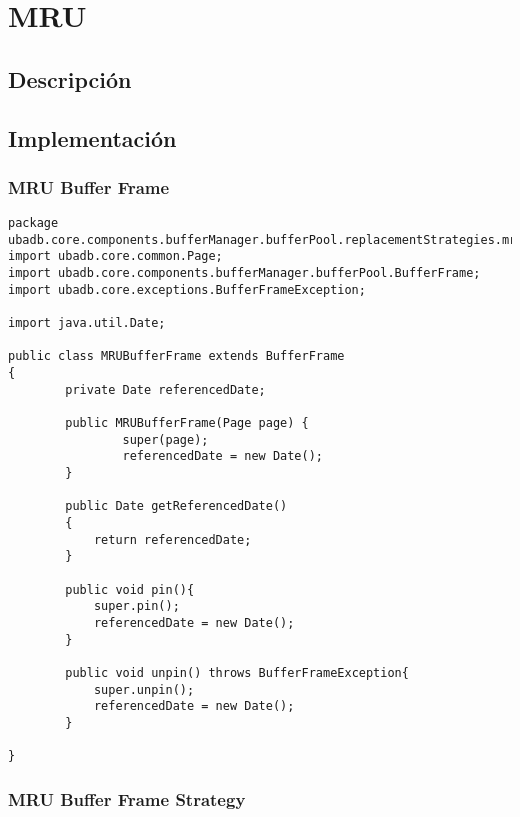 \section{MRU}

\subsection{Descripción}

\subsection{Implementación}
\subsubsection{MRU Buffer Frame}

\begin{lstlisting}
package ubadb.core.components.bufferManager.bufferPool.replacementStrategies.mru;
import ubadb.core.common.Page;
import ubadb.core.components.bufferManager.bufferPool.BufferFrame;
import ubadb.core.exceptions.BufferFrameException;

import java.util.Date;

public class MRUBufferFrame extends BufferFrame 
{
		private Date referencedDate;
	
        public MRUBufferFrame(Page page) {
                super(page); 
                referencedDate = new Date();
        }
        
        public Date getReferencedDate()
    	{
    		return referencedDate;
    	}
        
        public void pin(){
        	super.pin();
        	referencedDate = new Date();
        }
        
        public void unpin() throws BufferFrameException{
        	super.unpin();
        	referencedDate = new Date();
        }

}
\end{lstlisting}

\subsubsection{MRU Buffer Frame Strategy}

